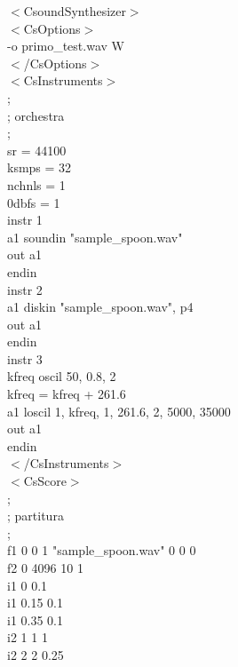 \documentclass[11pt]{article}
\begin{document}
\begin{multicols*}{2}
\begin{center}
\begin{minipage}[c]{6.2cm}
\begin{sffamily}
\scriptsize

$<$CsoundSynthesizer$>$\\
$<$CsOptions$>$\\
-o primo\_test.wav \-W\\
$<$/CsOptions$>$\\
$<$CsInstruments$>$\\
;\\
; orchestra\\
;\\
sr = 44100\\
ksmps = 32\\
nchnls = 1\\
0dbfs = 1\\

instr 1\\
a1 soundin "sample\_spoon.wav"\\
out a1\\
endin\\

instr 2\\
a1 diskin "sample\_spoon.wav", p4\\
out a1\\
endin\\

instr 3\\
kfreq oscil 50, 0.8, 2\\
kfreq = kfreq + 261.6\\
a1 loscil 1, kfreq, 1, 261.6, 2, 5000, 35000 \\
out a1\\
endin\\
$<$/CsInstruments$>$\\
$<$CsScore$>$\\
;\\
; partitura\\
;\\
f1 0 0 1 "sample\_spoon.wav" 0 0 0\\
f2 0 4096 10 1\\

i1 0    0.1\\
i1 0.15 0.1\\
i1 0.35 0.1\\

i2 1    1   1\\
i2 2    2   0.25\\


\end{sffamily}
\end{minipage}
\end{center}
\end{multicols*}
\end{document}
